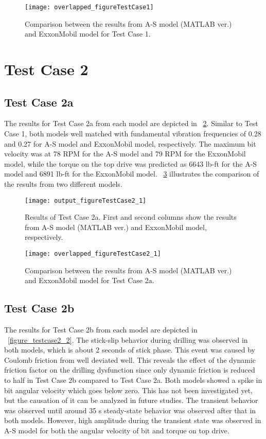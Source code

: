 \begin{figure}
  \centering
  \texttt{[image: overlapped\_figureTestCase1]}
  \caption[Comparison of the results for Test Case 1]{Comparison between the results from A-S model (MATLAB ver.) and ExxonMobil model for Test Case 1.}\label{figure_testcase1_overlapped}
\end{figure}

\section{Test Case 2}
\subsection{Test Case 2a}
The results for Test Case 2a from each model are depicted in \figurename~\ref{figure_testcase2_1}. Similar to Test Case 1, both models well matched with fundamental vibration frequencies of 0.28 and 0.27 for A-S model and ExxonMobil model, respectively. The maximum bit velocity was at 78 RPM for the A-S model and 79 RPM for the ExxonMobil model, while the torque on the top drive was predicted as 6643 lb-ft for the A-S model and 6891 lb-ft for the ExxonMobil model. \figurename~\ref{figure_testcase2_1_overlapped} illustrates the comparison of the results from two different models. 
\begin{figure}
  \centering
  \texttt{[image: output\_figureTestCase2\_1]}
  \caption[Results of Test Case 2a]{Results of Test Case 2a. First and second columns show the results from A-S model (MATLAB ver.) and ExxonMobil model, respectively.}\label{figure_testcase2_1}
\end{figure}

\begin{figure}
  \centering
  \texttt{[image: overlapped\_figureTestCase2\_1]}
  \caption[Comparison of the results for Test Case 2a]{Comparison between the results from A-S model (MATLAB ver.) and ExxonMobil model for Test Case 2a.}\label{figure_testcase2_1_overlapped}
\end{figure}


\subsection{Test Case 2b}
The results for Test Case 2b from each model are depicted in \figurename~\ref{figure_testcase2_2}. The stick-slip behavior during drilling was observed in both models, which is about 2 seconds of stick phase. This event was caused by Coulomb friction from well deviated well. This reveals the effect of the dynamic friction factor on the drilling dysfunction since only dynamic friction is reduced to half in Test Case 2b compared to Test Case 2a. Both models showed a spike in bit angular velocity which goes below zero. This has not been investigated yet, but the causation of it can be analyzed in future studies. The transient behavior was observed until around 35 s steady-state behavior was observed after that in both models. However, high amplitude during the transient state was observed in A-S model for both the angular velocity of bit and torque on top drive. 

